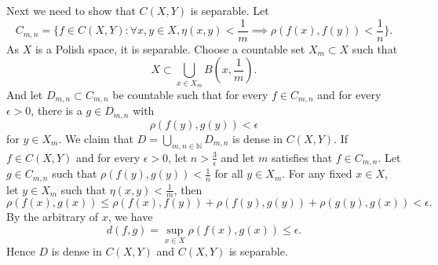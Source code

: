 \documentclass[12pt,a4paper]{ctexart}
\begin{document}
Next we need to show that $C(X, Y)$ is separable. Let
\begin{equation*}
    C_{m,n} = \{f \in C(X, Y): \forall x, y \in X, \eta(x, y) < \frac{1}{m} \implies \rho(f(x), f(y)) < \frac{1}{n} \}.
\end{equation*}
As $X$ is a Polish space, it is separable. Choose a countable set $X_{m} \subset X$ such that
\begin{equation*}
    X \subset \bigcup_{x \in X_{m}} B(x, \frac{1}{m}). 
\end{equation*}
And let $D_{m,n} \subset C_{m,n}$ be countable such that for every $f \in C_{m,n}$ and for every $\epsilon > 0$, there is a $g \in D_{m,n}$ with
\begin{equation*}
    \rho(f(y), g(y)) < \epsilon
\end{equation*}
for $y \in X_{m}$. We claim that $D = \bigcup_{m,n \in \mathbb{N}} D_{m,n}$ is dense in $C(X, Y)$. If $f \in C(X, Y)$ and for every $\epsilon > 0$, let $n > \frac{3}{\epsilon}$ and let $m$ satisfies that $f \in C_{m,n}$. Let $g \in C_{m,n}$ such that $\rho(f(y), g(y)) < \frac{1}{n}$ for all $y \in X_{m}$. For any fixed $x \in X$, let $y \in X_{m}$ such that $\eta(x, y) < \frac{1}{m}$, then
\begin{equation*}
    \rho(f(x), g(x)) \leq \rho(f(x), f(y)) + \rho(f(y), g(y)) + \rho(g(y), g(x)) < \epsilon. 
\end{equation*}
By the arbitrary of $x$, we have
\begin{equation*}
    d(f, g) = \sup_{x \in X} \rho(f(x), g(x)) \leq \epsilon.
\end{equation*}
Hence  $D$ is dense in $C(X, Y)$ and $C(X, Y)$ is separable.
  
\vspace{4pt}
\end{document}
